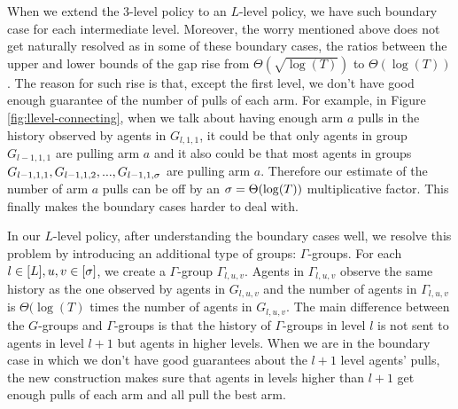 
When we extend the 3-level policy to an $L$-level policy, we have such boundary case for each intermediate level. Moreover, the worry mentioned above does not get naturally resolved as in some of these boundary cases, the ratios between the upper and lower bounds of the gap rise from $\Theta(\sqrt{\log(T)})$ to $\Theta(\log(T))$. The reason for such rise is that, except the first level, we don't have good enough guarantee of the number of pulls of each arm. For example, in Figure \ref{fig:llevel-connecting}, when we talk about having enough arm $a$ pulls in the history observed by agents in $G_{l,1,1}$, it could be that  only agents in group $G_{l-1,1,1}$ are pulling arm $a$ and it also could be that most agents in groups $G_{l-1,1,1},G_{l-1,1,2},...,G_{l-1,1,\sigma}$ are pulling arm $a$. Therefore our estimate of the number of arm $a$ pulls can be off by an $\sigma=\Theta(\log(T))$ multiplicative factor. This finally makes the boundary cases harder to deal with.

In our $L$-level policy, after understanding the boundary cases well, we resolve this problem by introducing an additional type of groups: $\Gamma$-groups. For each $l \in [L], u,v \in [\sigma]$, we create a $\Gamma$-group $\Gamma_{l,u,v}$. Agents in $\Gamma_{l,u,v}$ observe the same history as the one observed by agents in $G_{l,u,v}$ and the number of agents in $\Gamma_{l,u,v}$ is $\Theta(\log(T)$ times the number of agents in $G_{l,u,v}$. The main difference between the $G$-groups and $\Gamma$-groups is that the history of $\Gamma$-groups in level $l$ is not sent to agents in level $l+1$ but agents in higher levels. When we are in the boundary case in which we don't have good guarantees about the $l+1$ level agents' pulls, the new construction makes sure that agents in levels higher than $l+1$ get enough pulls of each arm and all pull the best arm. 
